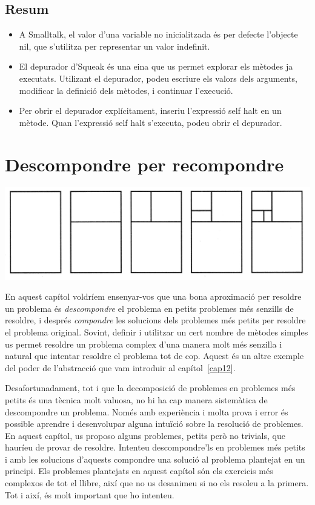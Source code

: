 \section{Resum}

\begin{itemize}
\item A Smalltalk, el valor d'una variable no inicialitzada és per defecte l'objecte \textsf{nil}, que s'utilitza per representar un valor indefinit.
\item El depurador d'Squeak és una eina que us permet explorar els mètodes ja executats. Utilizant el depurador, podeu escriure els valors dels arguments, modificar la definició dels mètodes, i continuar l'execució.
\item Per obrir el depurador explícitament, inseriu l'expressió \textsf{self halt} en un mètode. Quan l'expressió \textsf{self halt} s'executa, podeu obrir el depurador.
\end{itemize}

\chapter{Descompondre per recompondre} 
\label{cap16}

\includegraphics[scale=0.15]{Imatges/figura16-0.jpg}
\vspace*{2mm}

En aquest capítol voldríem ensenyar-vos que una bona aproximació per resoldre un problema és \emph{descompondre} el problema en petits problemes més senzills de resoldre, i després \emph{compondre} les solucions dels problemes més petits per resoldre el problema original. Sovint, definir i utilitzar un cert nombre de mètodes simples us permet resoldre un problema complex d'una manera molt més senzilla i natural que intentar resoldre el problema tot de cop. Aquest és un altre exemple del poder de l'abstracció que vam introduir al capítol~\ref{cap12}. 

Desafortunadament, tot i que la decomposició de problemes en problemes més petits és una tècnica molt valuosa, no hi ha cap manera sistemàtica de descompondre un problema. Només amb experiència i molta prova i error és possible aprendre i desenvolupar alguna intuïció sobre la resolució de problemes. En aquest capítol, us proposo alguns problemes, petits però no trivials, que hauríeu de provar de resoldre. Intenteu descompondre'ls en problemes més petits i amb les solucions d'aquests compondre una solució al problema plantejat en un principi. Els problemes plantejats en aquest capítol són els exercicis més complexos de tot el llibre, així que no us desanimeu si no els resoleu a la primera. Tot i així, és molt important que ho intenteu.

